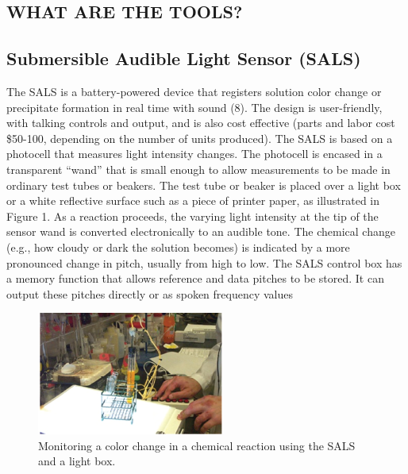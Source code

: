 \documentclass[11.5pt]{sig-alternate} %
\begin{document}
\begin{large}
\section*{WHAT ARE THE TOOLS?}

\subsection*{Submersible Audible Light Sensor (SALS)}

The SALS is a battery-powered device that registers solution color change or precipitate formation in real time with sound (8). The design is user-friendly, with talking controls and output, and is also cost effective (parts and labor cost \$50-100, depending on the number of units produced). The SALS is based on a  photocell that measures light intensity changes. The photocell is encased in a transparent “wand” that is small enough to allow measurements to be made in ordinary test tubes or beakers. The test tube or beaker is placed over a light box or a white reflective surface such as a piece of printer paper, as illustrated in Figure 1. As a reaction proceeds, the varying light intensity at the tip of the sensor wand is converted electronically to an audible tone. The chemical change (e.g., how cloudy or dark the solution becomes) is indicated by a more pronounced change in pitch, usually from high to low. The SALS control box has a memory function that allows reference and data pitches to be stored. It can output these pitches directly or as spoken frequency values

\begin{figure}[h]
    \centering
    \includegraphics[width=1\linewidth]{fig1.png}
    \caption{Monitoring a color change in a chemical reaction using the SALS and a light box.}
\end{figure}


\end{large}
\end{document}
